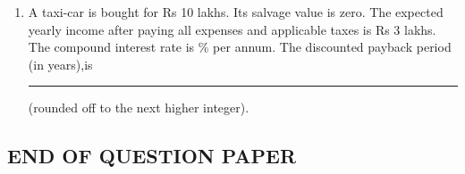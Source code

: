 \documentclass[journal,12pt,onecolumn]{IEEEtran}
\theoremstyle{remark}
\begin{document}
\begin{enumerate}
    \item A taxi-car is bought for Rs 10 lakhs. Its salvage value is zero. The expected yearly income after paying all expenses and applicable taxes is Rs 3 lakhs. The compound interest rate is \% per annum. The discounted payback period (in years),is \rule{2cm}{0.1mm}(rounded off to the next higher integer). 
    
\hfill{}
\end{enumerate}
    \centering
    \subsection*{END OF QUESTION PAPER}
\end{document}
